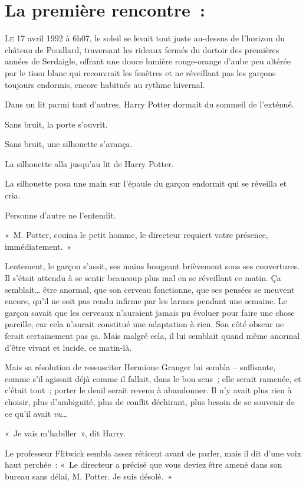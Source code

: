 
\section{La première rencontre~:}

\lettrine{L}{e} 17 avril 1992 à 6h07, le soleil se levait tout juste au-dessus de l'horizon du château de Poudlard, traversant les rideaux fermés du dortoir des premières années de Serdaigle, offrant une douce lumière rouge-orange d'aube peu altérée par le tissu blanc qui recouvrait les fenêtres et ne réveillant pas les garçons toujours endormis, encore habitués au rythme hivernal.

Dans un lit parmi tant d'autres, Harry Potter dormait du sommeil de l'exténué.

Sans bruit, la porte s'ouvrit.

Sans bruit, une silhouette s'avança.

La silhouette alla jusqu'au lit de Harry Potter.

La silhouette posa une main sur l'épaule du garçon endormit qui se réveilla et cria.

Personne d'autre ne l'entendit.

«~M. Potter, couina le petit homme, le directeur requiert votre présence, immédiatement.~»

Lentement, le garçon s'assit, ses mains bougeant brièvement sous ses couvertures.
Il s'était attendu à se sentir beaucoup plus mal en se réveillant ce matin.
Ça semblait… être anormal, que son cerveau fonctionne, que ses pensées se meuvent encore, qu'il ne soit pas rendu infirme par les larmes pendant une semaine.
Le garçon savait que les cerveaux n'auraient jamais pu évoluer pour faire une chose pareille, car cela n'aurait constitué une adaptation à rien.
Son côté obscur ne ferait certainement pas ça.
Mais malgré cela, il lui semblait quand même anormal d'être vivant et lucide, ce matin-là.

Mais sa résolution de ressusciter Hermione Granger lui sembla -- suffisante, comme s'il agissait déjà comme il fallait, dans le bon sens~; elle serait ramenée, et c'était tout~; porter le deuil serait revenu à abandonner.
Il n'y avait plus rien à choisir, plus d'ambiguïté, plus de conflit déchirant, plus besoin de se souvenir de ce qu'il avait \emph{vu}…

«~Je vais m'habiller~», dit Harry.

Le professeur Flitwick sembla assez réticent avant de parler, mais il dit d'une voix haut perchée~: «~Le directeur a précisé que vous deviez être amené dans son bureau sans délai, M. Potter.
Je suis désolé.~»

